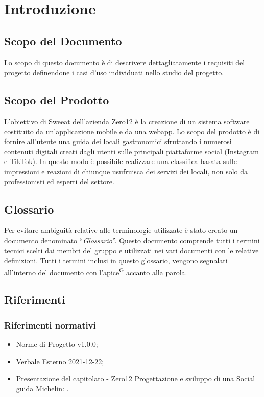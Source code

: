 \section{Introduzione}

\subsection{Scopo del Documento}
Lo scopo di questo documento è di descrivere dettagliatamente i requisiti del progetto definendone i casi d’uso individuati nello studio del progetto.

\subsection{Scopo del Prodotto}

L’obiettivo di Sweeat dell’azienda Zero12 è la creazione di un sistema software costituito da un’applicazione mobile e da una webapp. Lo scopo del prodotto è di fornire all’utente una guida dei locali gastronomici sfruttando i numerosi contenuti digitali creati dagli utenti sulle principali piattaforme social (Instagram e TikTok). In questo modo è possibile realizzare una classifica basata sulle impressioni e reazioni di chiunque usufruisca dei servizi dei locali, non solo da professionisti ed esperti del settore.

\subsection{Glossario}

Per evitare ambiguità relative alle terminologie utilizzate è stato creato un documento denominato “\textit{Glossario}”. Questo documento comprende tutti i termini tecnici scelti dai membri del gruppo e utilizzati nei vari documenti con le relative definizioni. Tutti i termini inclusi in questo glossario, vengono segnalati all’interno del documento con l’apice\textsuperscript{G} accanto alla parola.

\subsection{Riferimenti}

\subsubsection{Riferimenti normativi}
\begin{itemize}
    \item Norme di Progetto v1.0.0;
    \item Verbale Esterno 2021-12-22;
    \item Presentazione del capitolato - Zero12 Progettazione e sviluppo di una Social guida Michelin: \newline {}.
\end{itemize}
